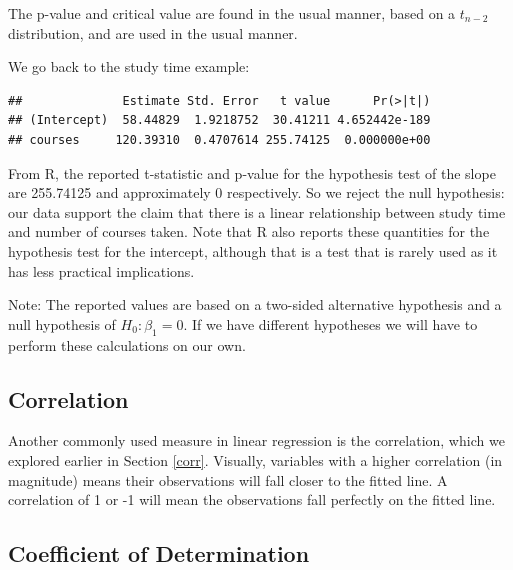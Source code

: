 \documentclass[
]{book}
\newenvironment{Shaded}{\begin{snugshade}}{\end{snugshade}}
\newcommand{\DocumentationTok}[1]{\textcolor[rgb]{0.56,0.35,0.01}{\textbf{\textit{#1}}}}
\newcommand{\FunctionTok}[1]{\textcolor[rgb]{0.13,0.29,0.53}{\textbf{#1}}}
\newcommand{\NormalTok}[1]{#1}
\newcommand{\SpecialCharTok}[1]{\textcolor[rgb]{0.81,0.36,0.00}{\textbf{#1}}}
\begin{document}
The p-value and critical value are found in the usual manner, based on a \(t_{n-2}\) distribution, and are used in the usual manner.

We go back to the study time example:

\begin{Shaded}
\end{Shaded}

\begin{verbatim}
##              Estimate Std. Error   t value      Pr(>|t|)
## (Intercept)  58.44829  1.9218752  30.41211 4.652442e-189
## courses     120.39310  0.4707614 255.74125  0.000000e+00
\end{verbatim}

From R, the reported t-statistic and p-value for the hypothesis test of the slope are 255.74125 and approximately 0 respectively. So we reject the null hypothesis: our data support the claim that there is a linear relationship between study time and number of courses taken. Note that R also reports these quantities for the hypothesis test for the intercept, although that is a test that is rarely used as it has less practical implications.

Note: The reported values are based on a two-sided alternative hypothesis and a null hypothesis of \(H_0: \beta_1 = 0\). If we have different hypotheses we will have to perform these calculations on our own.

\hypertarget{correlation}{%
\subsection{Correlation}\label{correlation}}

Another commonly used measure in linear regression is the correlation, which we explored earlier in Section \ref{corr}. Visually, variables with a higher correlation (in magnitude) means their observations will fall closer to the fitted line. A correlation of 1 or -1 will mean the observations fall perfectly on the fitted line.

\hypertarget{coefficient-of-determination}{%
\subsection{Coefficient of Determination}\label{coefficient-of-determination}}
\end{document}
